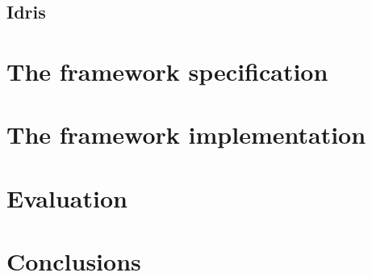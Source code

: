 \documentclass[dissertation]{softeng}
\begin{document}
\section{Idris}

\newpage
\chapter{The framework specification}

\newpage
\chapter{The framework implementation}

\newpage
\chapter{Evaluation}

\newpage
\chapter{Conclusions}

\newpage




\clearpage
\end{document}
